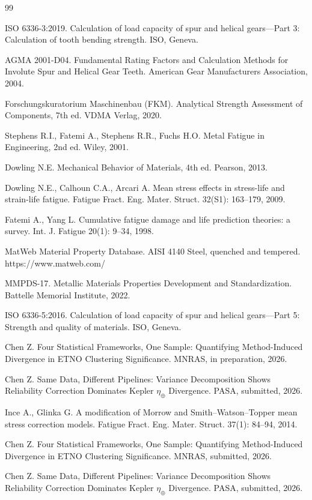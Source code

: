 \documentclass[12pt,a4paper]{article}
\begin{document}
\begin{thebibliography}{99}

ISO 6336-3:2019. Calculation of load capacity of spur and helical
gears---Part 3: Calculation of tooth bending strength. ISO, Geneva.

AGMA 2001-D04. Fundamental Rating Factors and Calculation Methods for
Involute Spur and Helical Gear Teeth. American Gear Manufacturers
Association, 2004.

Forschungskuratorium Maschinenbau (FKM). Analytical Strength Assessment
of Components, 7th ed. VDMA Verlag, 2020.

Stephens R.I., Fatemi A., Stephens R.R., Fuchs H.O. Metal Fatigue in
Engineering, 2nd ed. Wiley, 2001.

Dowling N.E. Mechanical Behavior of Materials, 4th ed. Pearson, 2013.

Dowling N.E., Calhoun C.A., Arcari A. Mean stress effects in
stress-life and strain-life fatigue. Fatigue Fract. Eng. Mater. Struct.
32(S1): 163--179, 2009.

Fatemi A., Yang L. Cumulative fatigue damage and life prediction
theories: a survey. Int. J. Fatigue 20(1): 9--34, 1998.

MatWeb Material Property Database. AISI 4140 Steel, quenched and
tempered. https://www.matweb.com/

MMPDS-17. Metallic Materials Properties Development and Standardization.
Battelle Memorial Institute, 2022.

ISO 6336-5:2016. Calculation of load capacity of spur and helical
gears---Part 5: Strength and quality of materials. ISO, Geneva.

Chen Z. Four Statistical Frameworks, One Sample: Quantifying
Method-Induced Divergence in ETNO Clustering Significance.
MNRAS, in preparation, 2026.

Chen Z. Same Data, Different Pipelines: Variance Decomposition Shows
Reliability Correction Dominates Kepler $\eta_\oplus$ Divergence.
PASA, submitted, 2026.

Ince A., Glinka G. A modification of Morrow and Smith--Watson--Topper
mean stress correction models. Fatigue Fract. Eng. Mater. Struct.
37(1): 84--94, 2014.

Chen Z. Four Statistical Frameworks, One Sample: Quantifying
Method-Induced Divergence in ETNO Clustering Significance. MNRAS,
submitted, 2026.

Chen Z. Same Data, Different Pipelines: Variance Decomposition Shows
Reliability Correction Dominates Kepler $\eta_\oplus$ Divergence.
PASA, submitted, 2026.

\end{thebibliography}
\end{document}

